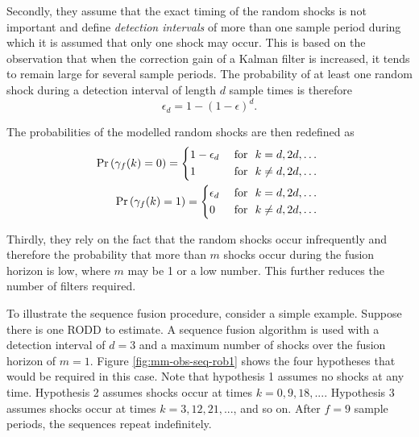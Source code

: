 Secondly, they assume that the exact timing of the random shocks is not important and define \textit{detection intervals} of more than one sample period during which it is assumed that only one shock may occur. This is based on the observation that when the correction gain of a Kalman filter is increased, it tends to remain large for several sample periods. The probability of at least one random shock during a detection interval of length $d$ sample times is therefore
\begin{equation} \label{eq:p_gamma_d}
	\epsilon_d = 1 - (1 - \epsilon)^d.
\end{equation}

The probabilities of the modelled random shocks are then redefined as
\begin{equation} \label{eq:Pr_gamma_nd}
	\begin{aligned}
		\Pr\left(\gamma_{f}(k)=0\right) = \begin{cases*}
			1 - \epsilon_d & \text { for } $k = d, 2d, \ldots$ \\
			1 & \text { for } $k \ne d, 2d, \ldots$
		\end{cases*} \\
		\Pr\left(\gamma_{f}(k)=1\right) = \begin{cases*}
			\epsilon_d & \text { for } $k = d, 2d, \ldots$ \\
			0 & \text { for } $k \ne d, 2d, \ldots$
		\end{cases*} \\
	\end{aligned}
\end{equation}

Thirdly, they rely on the fact that the random shocks occur infrequently and therefore the probability that more than $m$ shocks occur during the fusion horizon is low, where $m$ may be 1 or a low number. This further reduces the number of filters required.

To illustrate the sequence fusion procedure, consider a simple example. Suppose there is one RODD to estimate. A sequence fusion algorithm is used with a detection interval of $d=3$ and a maximum number of shocks over the fusion horizon of $m=1$. Figure \ref{fig:mm-obs-seq-rob1} shows the four hypotheses that would be required in this case. Note that hypothesis 1 assumes no shocks at any time. Hypothesis 2 assumes shocks occur at times $k=0,9,18,...$. Hypothesis 3 assumes shocks occur at times $k=3,12,21,...$, and so on. After $f=9$ sample periods, the sequences repeat indefinitely. 

